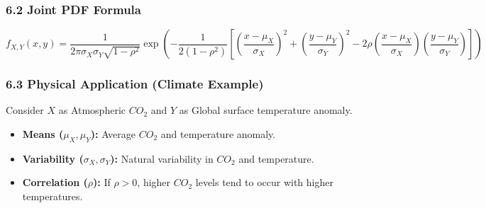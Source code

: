 \documentclass{article}
\begin{document}
\subsubsection*{6.2 Joint PDF Formula}
$$f_{X,Y}(x,y) = \frac{1}{2\pi\sigma_{X}\sigma_{Y}\sqrt{1-\rho^2}} \exp \left( -\frac{1}{2(1-\rho^2)} \left[ \left(\frac{x-\mu_X}{\sigma_X}\right)^2 + \left(\frac{y-\mu_Y}{\sigma_Y}\right)^2 - 2\rho \left(\frac{x-\mu_X}{\sigma_X}\right) \left(\frac{y-\mu_Y}{\sigma_Y}\right) \right] \right)$$

\subsubsection*{6.3 Physical Application (Climate Example)}
Consider $X$ as Atmospheric $CO_2$ and $Y$ as Global surface temperature anomaly.
\begin{itemize}
    \item \textbf{Means ($\mu_X, \mu_Y$):} Average $CO_2$ and temperature anomaly.
    \item \textbf{Variability ($\sigma_X, \sigma_Y$):} Natural variability in $CO_2$ and temperature.
    \item \textbf{Correlation ($\rho$):} If $\rho > 0$, higher $CO_2$ levels tend to occur with higher temperatures.
\end{itemize}
\end{document}
